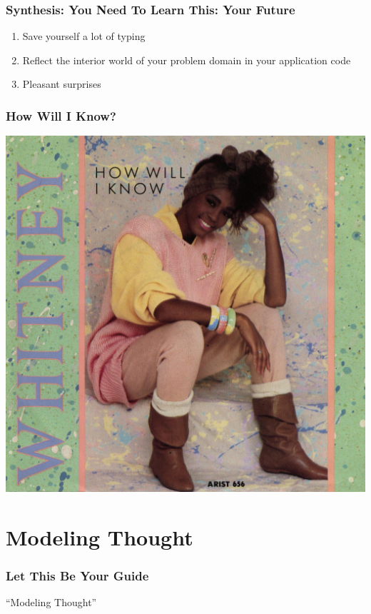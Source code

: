\documentclass[slidestop,compress,mathserif]{beamer}
\begin{document}
\begin{frame}
	\frametitle{Synthesis:  You Need To Learn This:  Your Future}
	\begin{enumerate}
		\item Save yourself a lot of typing
		\pause
		\item Reflect the interior world of your problem domain in your application code
		\pause
		\item Pleasant surprises
	\end{enumerate}
\end{frame}

\begin{frame}
	\frametitle{How Will I Know?}
	\begin{center}
		\includegraphics[scale=0.10]{img/whitney.jpg}
	\end{center}
\end{frame}

\section{Modeling Thought} %
\label{sec:modeling_thought}

\begin{frame}
	\frametitle{Let This Be Your Guide}
	\begin{center}
		``Modeling Thought''
	\end{center}
\end{frame}
\end{document}
